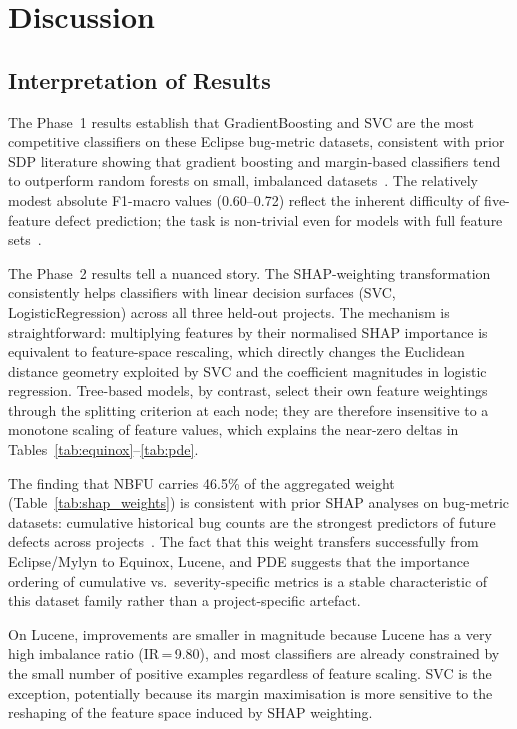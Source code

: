 \documentclass[12pt, a4paper]{article}
\newcommand{\model}[1]{\textsf{#1}}
\begin{document}
\section{Discussion}
\label{sec:discussion}

\subsection{Interpretation of Results}

The Phase~1 results establish that \model{GradientBoosting} and \model{SVC}
are the most competitive classifiers on these Eclipse bug-metric datasets,
consistent with prior SDP literature showing that gradient boosting and
margin-based classifiers tend to outperform random forests on small,
imbalanced datasets~\cite{hall2012,li2025}. The relatively modest absolute
F1-macro values (0.60--0.72) reflect the inherent difficulty of five-feature
defect prediction; the task is non-trivial even for models with full feature
sets~\cite{dambros2012}.

The Phase~2 results tell a nuanced story. The SHAP-weighting transformation
consistently helps classifiers with linear decision surfaces (\model{SVC},
\model{LogisticRegression}) across all three held-out projects. The mechanism
is straightforward: multiplying features by their normalised SHAP importance
is equivalent to feature-space rescaling, which directly changes the Euclidean
distance geometry exploited by \model{SVC} and the coefficient magnitudes in
logistic regression. Tree-based models, by contrast, select their own feature
weightings through the splitting criterion at each node; they are therefore
insensitive to a monotone scaling of feature values, which explains the
near-zero deltas in Tables~\ref{tab:equinox}--\ref{tab:pde}.

The finding that NBFU carries 46.5\% of the aggregated weight
(Table~\ref{tab:shap_weights}) is consistent with prior SHAP analyses on
bug-metric datasets: cumulative historical bug counts are the strongest
predictors of future defects across projects~\cite{shin2021,alsmadi2023}.
The fact that this weight transfers successfully from Eclipse/Mylyn to
Equinox, Lucene, and PDE suggests that the importance ordering of cumulative
vs.\ severity-specific metrics is a stable characteristic of this dataset
family rather than a project-specific artefact.

On Lucene, improvements are smaller in magnitude because Lucene has a very
high imbalance ratio (IR\,=\,9.80), and most classifiers are already
constrained by the small number of positive examples regardless of feature
scaling. \model{SVC} is the exception, potentially because its margin
maximisation is more sensitive to the reshaping of the feature space induced
by SHAP weighting.
\end{document}
